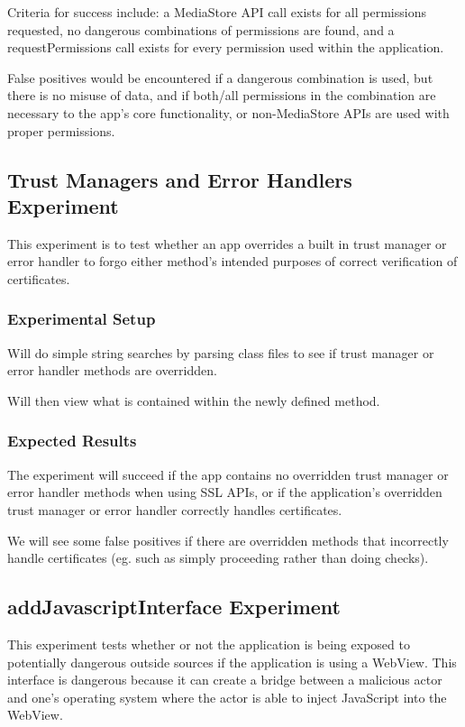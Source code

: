 \documentclass[10pt,twocolumn,pdftex]{article}
\begin{document}
    Criteria for success include:
    a MediaStore API call exists for all permissions requested, 
    no dangerous combinations of permissions are found, and
    a requestPermissions call exists for every permission used within the application.

    False positives would be encountered if
    a dangerous combination is used, but there is no misuse of data, and if both/all permissions in the combination are necessary to the app’s core functionality, or 
    non-MediaStore APIs are used with proper permissions.


\subsection{Trust Managers and Error Handlers Experiment}
    This experiment is to test whether an app overrides a built in trust manager or error handler to forgo either method's intended purposes of correct verification of certificates. 

    \subsubsection{Experimental Setup}
    Will do simple string searches by parsing class files to see if trust manager or error handler methods are overridden.
    
    Will then view what is contained within the newly defined method. 

    \subsubsection{Expected Results}
    The experiment will succeed if the app contains no overridden trust manager or error handler methods when using SSL APIs, or if the application's overridden trust manager or error handler correctly handles certificates.

    We will see some false positives if there are overridden methods that incorrectly handle certificates (eg. such as simply proceeding rather than doing checks).


\subsection{addJavascriptInterface Experiment}
This experiment tests whether or not the application is being exposed to potentially dangerous outside sources if the application is using a WebView. This interface is dangerous because it can create a bridge between a malicious actor and one's operating system where the actor is able to inject JavaScript into the WebView.
\end{document}
